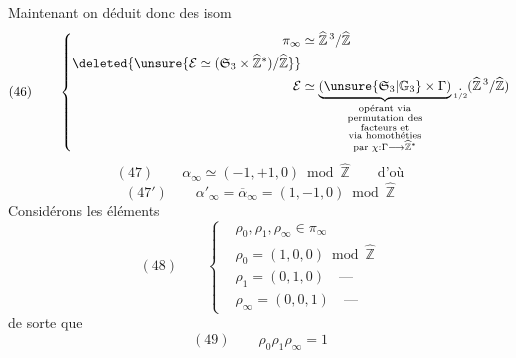 Maintenant on déduit donc des isom
\[
(46)\qquad\left\{\begin{aligned}
\pi_\infty&\simeq\widehat{\mathbb Z}^{\,3}/\widehat{\mathbb Z}\\
\deleted{\unsure{\mathcal E\simeq(\mathfrak S_3\times\widehat{\mathbb Z}^{*})/\widehat{\mathbb Z}}}&\\
\mathcal E&\simeq
\underbrace{(\unsure{\mathfrak S_3|\mathbb G_3}\times\Gamma)}_{
\substack{\text{opérant via}\\\text{permutation des}\\\text{facteurs et}\\
\text{via homothéties}\\\text{par }\chi:\Gamma\longrightarrow\widehat{\mathbb Z}^{*}}}
\mathbin{\underset{\scriptscriptstyle1/2}{.}}
(\widehat{\mathbb Z}^{\,3}/\widehat{\mathbb Z})
\end{aligned}\right.
\]
\[
(47)\qquad\alpha_\infty\simeq(-1,+1,0)\bmod\widehat{\mathbb Z}
\qquad\text{d'où}
\]
\[
(47')\qquad\alpha'_\infty=\overline\alpha_\infty
=(1,-1,0)\bmod\widehat{\mathbb Z}
\]
Considérons les éléments
\[
(48)\qquad\left\{\begin{aligned}
&\rho_0,\rho_1,\rho_\infty\in\pi_\infty\\
&\rho_0=(1,0,0)\bmod\widehat{\mathbb Z}\\
&\rho_1=(0,1,0)\quad\text{---}\\
&\rho_\infty=(0,0,1)\quad\text{---}
\end{aligned}\right.
\]
de sorte que
\[
(49)\qquad\rho_0\rho_1\rho_\infty=1
\]

